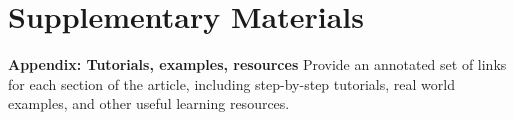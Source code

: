 \documentclass[12pt]{article}
\begin{document}
\section{Supplementary Materials}\label{supplementary-materials}

\textbf{Appendix: Tutorials, examples, resources} Provide an annotated
set of links for each section of the article, including step-by-step
tutorials, real world examples, and other useful learning resources.



\end{document}
